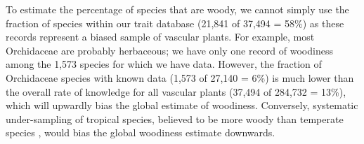 \documentclass[a4paper,12pt]{article}
\begin{document}
To estimate the percentage of species that are woody, we cannot simply
use the fraction of species within our trait database (21,841 of
37,494 = 58\%) as these records represent a biased sample of vascular
plants.
For example, most Orchidaceae are probably herbaceous; we have only
one record of woodiness among the 1,573 species for which we have
data.
However, the fraction of Orchidaceae species with known data (1,573 of
27,140 = 6\%)
is much lower than the overall rate of knowledge for all vascular
plants (37,494 of 284,732 = 13\%), which will upwardly bias the global
estimate of woodiness.
Conversely, systematic under-sampling of tropical species, believed to
be more woody than temperate species \citep{Molesheihgt}, would bias
the global woodiness estimate downwards.

\end{document}
